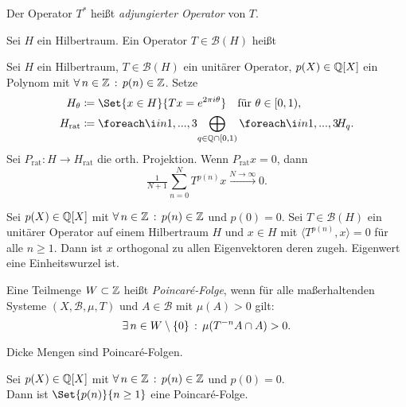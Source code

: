 \documentclass{cheat-sheet}
\newcommand{\nspace}[1]{\foreach \i in {1,...,#1}{ \! }} %
\newcommand{\Bor}{\mathcal{B}} %
\newcommand{\meST}{$(X, \Bor, \mu, T)$} %
\newcommand{\Boun}{\mathcal{B}} %
\newcommand{\scp}[2]{\langle #1 , #2 \rangle} %
\begin{document}
\begin{defn}
  Der Operator $T^*$ heißt \emph{adjungierter Operator} von $T$.
\end{defn}

\begin{defn}
  Sei $H$ ein Hilbertraum.
  Ein Operator $T \in \Boun(H)$ heißt \\
   \enspace
\end{defn}


\begin{lem}
  Sei $H$ ein Hilbertraum, $T \in \Boun(H)$ ein unitärer Operator, $p(X) \in \mathbb{Q}[X]$ ein Polynom mit $\forall \, {n \in \mathbb{Z}} \,:\, p(n) \in \mathbb{Z}$. Setze
  \begin{align*}
    H_\theta & \coloneqq \Set{x \in H}{Tx = e^{2 \pi i \theta}} \quad
    \text{für $\theta \in \cointerval{0}{1}$,} \\
    H_{\text{rat}} & \coloneqq \nspace{3} \bigoplus_{q \in \Q \cap \cointerval{0}{1}} \nspace{3} H_q.
  \end{align*}
  Sei $P_{\text{rat}} : H \to H_{\text{rat}}$ die orth. Projektion. Wenn $P_{\text{rat}} x = 0$, dann
  \[ \tfrac{1}{N + 1} \sum_{n=0}^N T^{p(n)} x \xrightarrow{N \to \infty} 0. \]
\end{lem}

\begin{prop}
  Sei $p(X) \in \mathbb{Q}[X]$ mit $\forall \, {n \in \mathbb{Z}} \,:\, p(n) \in \mathbb{Z}$ und $p(0) = 0$.
  Sei $T \in \Boun(H)$ ein unitärer Operator auf einem Hilbertraum $H$ und $x \in H$ mit $\scp{T^{p(n)}}{x} = 0$ für alle $n \geq 1$. Dann ist $x$ orthogonal zu allen Eigenvektoren deren zugeh. Eigenwert eine Einheitswurzel ist.
\end{prop}

\begin{defn}
  Eine Teilmenge $W \subset \mathbb{Z}$ heißt \emph{Poincaré-Folge}, wenn für alle maßerhaltenden Systeme \meST{} und $A \in \Bor$ mit $\mu(A) > 0$ gilt:
  \[ \exists \, {n \in W \setminus \{ 0 \}} \,:\, \mu(T^{-n} A \cap A) > 0. \]
\end{defn}

\begin{bsp}
  Dicke Mengen sind Poincaré-Folgen.
\end{bsp}

\begin{thm}
  Sei $p(X) \in \mathbb{Q}[X]$ mit $\forall \, {n \in \mathbb{Z}} \,:\, p(n) \in \mathbb{Z}$ und $p(0) = 0$. \\
  Dann ist $\Set{p(n)}{n \geq 1}$ eine Poincaré-Folge.
\end{thm}
\end{document}
